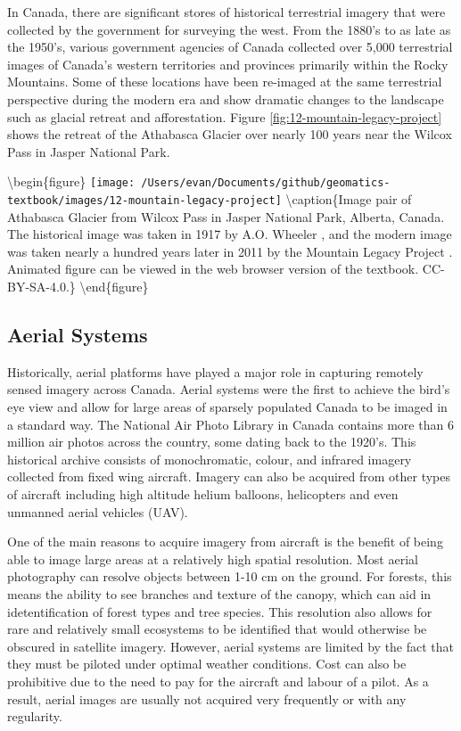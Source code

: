 \documentclass[
]{book}
\begin{document}
In Canada, there are significant stores of historical terrestrial imagery that were collected by the government for surveying the west. From the 1880's to as late as the 1950's, various government agencies of Canada collected over 5,000 terrestrial images of Canada's western territories and provinces primarily within the Rocky Mountains. Some of these locations have been re-imaged at the same terrestrial perspective during the modern era and show dramatic changes to the landscape such as glacial retreat and afforestation. Figure \ref{fig:12-mountain-legacy-project} shows the retreat of the Athabasca Glacier over nearly 100 years near the Wilcox Pass in Jasper National Park.

\textbackslash begin\{figure\}
\texttt{[image: /Users/evan/Documents/github/geomatics-textbook/images/12-mountain-legacy-project]} \textbackslash caption\{Image pair of Athabasca Glacier from Wilcox Pass in Jasper National Park, Alberta, Canada. The historical image was taken in 1917 by A.O. Wheeler \citep{library_and_archives_canada_athabasca_1917}, and the modern image was taken nearly a hundred years later in 2011 by the Mountain Legacy Project \citep{mountain_legacy_project_modern_2011}. Animated figure can be viewed in the web browser version of the textbook. CC-BY-SA-4.0.\}\label{fig:12-mountain-legacy-project}
\textbackslash end\{figure\}

\hypertarget{aerial-systems}{%
\subsection{Aerial Systems}\label{aerial-systems}}

Historically, aerial platforms have played a major role in capturing remotely sensed imagery across Canada. Aerial systems were the first to achieve the bird's eye view and allow for large areas of sparsely populated Canada to be imaged in a standard way. The National Air Photo Library in Canada contains more than 6 million air photos across the country, some dating back to the 1920's. This historical archive consists of monochromatic, colour, and infrared imagery collected from fixed wing aircraft. Imagery can also be acquired from other types of aircraft including high altitude helium balloons, helicopters and even unmanned aerial vehicles (UAV).

One of the main reasons to acquire imagery from aircraft is the benefit of being able to image large areas at a relatively high spatial resolution. Most aerial photography can resolve objects between 1-10 cm on the ground. For forests, this means the ability to see branches and texture of the canopy, which can aid in idetentification of forest types and tree species. This resolution also allows for rare and relatively small ecosystems to be identified that would otherwise be obscured in satellite imagery. However, aerial systems are limited by the fact that they must be piloted under optimal weather conditions. Cost can also be prohibitive due to the need to pay for the aircraft and labour of a pilot. As a result, aerial images are usually not acquired very frequently or with any regularity.
\end{document}
